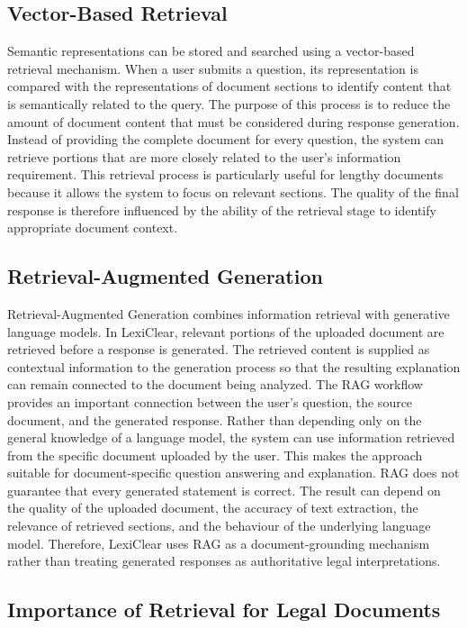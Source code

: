 \documentclass[12pt,a4paper,oneside]{report}
\begin{document}
\subsection{Vector-Based Retrieval}

Semantic representations can be stored and searched using a vector-based
retrieval mechanism. When a user submits a question, its representation is
compared with the representations of document sections to identify content
that is semantically related to the query. The purpose of this process is to reduce the amount of document content that
must be considered during response generation. Instead of providing the
complete document for every question, the system can retrieve portions that
are more closely related to the user's information requirement. This retrieval process is particularly useful for lengthy documents because
it allows the system to focus on relevant sections. The quality of the final
response is therefore influenced by the ability of the retrieval stage to
identify appropriate document context.

\subsection{Retrieval-Augmented Generation}

Retrieval-Augmented Generation combines information retrieval with
generative language models. In LexiClear, relevant portions of the uploaded
document are retrieved before a response is generated. The retrieved
content is supplied as contextual information to the generation process so
that the resulting explanation can remain connected to the document being
analyzed. The RAG workflow provides an important connection between the user's
question, the source document, and the generated response. Rather than
depending only on the general knowledge of a language model, the system can
use information retrieved from the specific document uploaded by the user.
This makes the approach suitable for document-specific question answering
and explanation. RAG does not guarantee that every generated statement is correct. The
result can depend on the quality of the uploaded document, the accuracy of
text extraction, the relevance of retrieved sections, and the behaviour of
the underlying language model. Therefore, LexiClear uses RAG as a
document-grounding mechanism rather than treating generated responses as
authoritative legal interpretations.

\subsection{Importance of Retrieval for Legal Documents}
\end{document}
